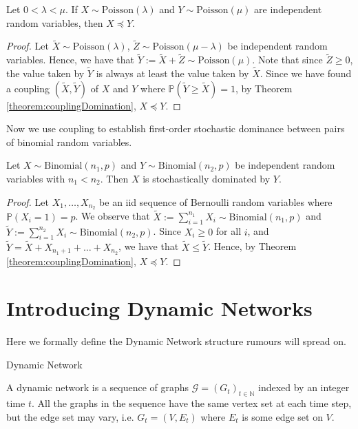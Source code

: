 \begin{theorem}
	Let $0 < \lambda < \mu$. If $X \sim \text{Poisson}(\lambda)$ and $Y \sim \text{Poisson}(\mu)$ are independent random variables, then $X \preceq Y$. 
\end{theorem}

\begin{proof}
	Let $\tilde{X} \sim \text{Poisson}(\lambda)$, $\tilde{Z} \sim \text{Poisson}(\mu - \lambda)$ be independent random variables. Hence, we have that $\tilde{Y} := \tilde{X} + \tilde{Z} \sim \text{Poisson}(\mu)$. Note that since $\tilde{Z} \geq 0$, the value taken by $\tilde{Y}$ is always at least the value taken by $\tilde{X}$. Since we have found a coupling $(\tilde{X}, \tilde{Y})$ of $X$ and $Y$ where $\mathbb{P}(\tilde{Y} \geq \tilde{X}) = 1$, by Theorem \ref{theorem:couplingDomination}, $X \preceq Y$.
\end{proof}

Now we use coupling to establish first-order stochastic dominance between pairs of binomial random variables.

\begin{theorem}
	Let $X \sim \text{Binomial}(n_1, p)$ and $Y \sim \text{Binomial}(n_2, p)$ be independent random variables with $n_1 < n_2$. Then $X$ is stochastically dominated by $Y$.
\end{theorem}

\begin{proof}
	Let $X_1, \dots, X_{n_2}$ be an iid sequence of Bernoulli random variables where $\mathbb{P}(X_i = 1) = p$. We observe that $\tilde{X} := \sum_{i=1}^{n_1} X_i \sim \text{Binomial}(n_1, p)$ and $\tilde{Y} := \sum_{i=1}^{n_2} X_i \sim \text{Binomial}(n_2, p)$. Since $X_i \geq 0$ for all $i$, and $\tilde{Y} = \tilde{X} + X_{n_1 + 1} + \dots + X_{n_2}$, we have that $\tilde{X} \leq \tilde{Y}$. Hence, by Theorem \ref{theorem:couplingDomination}, $X \preceq Y$.
\end{proof}

\section{Introducing Dynamic Networks}

Here we formally define the Dynamic Network structure rumours will spread on.

\begin{definition}
	Dynamic Network

	\noindent
	A dynamic network is a sequence of graphs $\mathcal{G} = (G_t)_{t \in \mathbb{N}}$ indexed by an integer time $t$. All the graphs in the sequence have the same vertex set at each time step, but the edge set may vary, i.e.  $G_t = (V, E_t)$ where $E_t$ is some edge set on $V$.
\end{definition}

